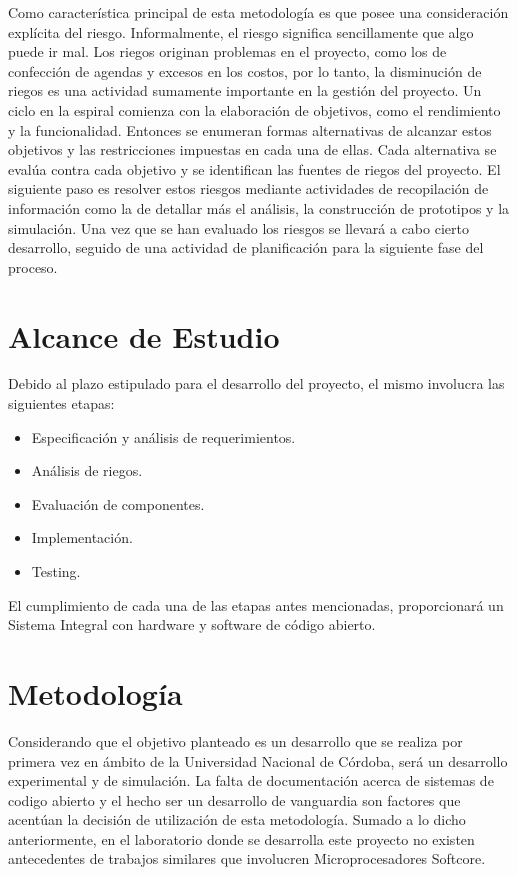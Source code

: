 Como característica principal de esta metodología es que posee una consideración explícita del riesgo. Informalmente, el riesgo significa
sencillamente que algo puede ir mal. Los riegos originan problemas en el proyecto, como los de confección de agendas y excesos en los costos, por lo
tanto, la disminución de riegos es una actividad sumamente importante en la gestión del proyecto. Un ciclo en la espiral comienza con la elaboración
de objetivos, como el rendimiento y la funcionalidad. Entonces se enumeran formas alternativas de alcanzar estos objetivos y las restricciones
impuestas en cada una de ellas. Cada alternativa se evalúa contra cada objetivo y se identifican las fuentes de riegos del proyecto. El siguiente
paso es resolver estos riesgos mediante actividades de recopilación de información como la de detallar más el análisis, la construcción de prototipos
y la simulación. Una vez que se han evaluado los riesgos se llevará a cabo cierto desarrollo, seguido de una actividad de planificación para la
siguiente fase del proceso.

\section{Alcance de Estudio}
Debido al plazo estipulado para el desarrollo del proyecto, el mismo involucra las siguientes etapas: 

\begin {itemize}
	\item Especificación y análisis de requerimientos.
	\item Análisis de riegos.
	\item Evaluación de componentes.
	\item Implementación.
	\item Testing.
\end {itemize}

El cumplimiento de cada una de las etapas antes mencionadas, proporcionará un Sistema Integral con hardware y software de código abierto.

\section{Metodología}
Considerando que el objetivo planteado es un desarrollo que se realiza por primera vez en ámbito de la Universidad Nacional de Córdoba, será un
desarrollo experimental y de simulación. La falta de documentación acerca de sistemas de codigo abierto y el hecho ser un desarrollo de vanguardia son
factores que acentúan la decisión de utilización de esta metodología. Sumado a lo dicho anteriormente, en el laboratorio donde se desarrolla este
proyecto no existen antecedentes de trabajos similares que involucren Microprocesadores Softcore.
